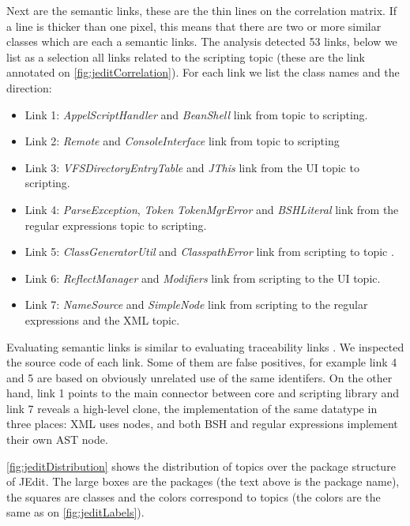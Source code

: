 Next are the semantic links, these are the thin lines on the correlation matrix. If a line is thicker than one pixel, this means that there are two or more similar classes which are each a semantic links. The analysis detected 53 links, below we list as a selection all links related to the scripting topic (these are the link annotated on \autoref{fig:jeditCorrelation}). For each link we list the class names and the direction:

\begin{itemize}
  \item Link 1: \emph{AppelScriptHandler} and \emph{BeanShell} link from topic \red to scripting.
  \item Link 2: \emph{Remote} and \emph{ConsoleInterface} link from topic \red to scripting
  \item Link 3: \emph{VFSDirectoryEntryTable} and \emph{JThis} link from the UI topic to scripting.
  \item Link 4: \emph{ParseException}, \emph{Token} \emph{TokenMgrError} and \emph{BSHLiteral} link from the regular expressions topic to scripting.
  \item Link 5: \emph{ClassGeneratorUtil} and \emph{ClasspathError} link from scripting to topic \red.
  \item Link 6: \emph{ReflectManager} and \emph{Modifiers} link from scripting to the UI topic.
  \item Link 7: \emph{NameSource} and \emph{SimpleNode} link from scripting to the regular expressions and the XML topic.
\end{itemize}

Evaluating semantic links is similar to evaluating traceability links \cite{Luci04a}. We inspected the source code of each link. Some of them are false positives, for example link 4 and 5 are based on obviously unrelated use of the same identifers. On the other hand, link 1 points to the main connector between core and scripting library and link 7 reveals a high-level clone, the implementation of the same datatype in three places: XML uses nodes, and both BSH and regular expressions implement their own AST node.


\autoref{fig:jeditDistribution} shows the distribution of topics over the package structure of JEdit. The large boxes are the packages (the text above is the package name), the squares are classes and the colors correspond to topics (the colors are the same as on \autoref{fig:jeditLabels}).

